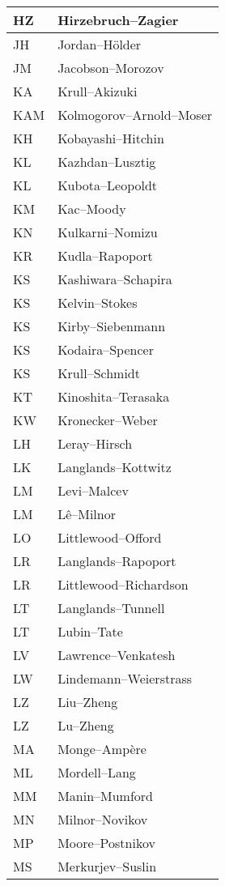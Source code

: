 \documentclass{amsart}
\numberwithin{equation}{section}
\theoremstyle{plain}
\numberwithin{equation}{section}
\theoremstyle{remark}
\begin{document}
\begin{multicols}{2}
{\begin{longtable}{l|l}
HZ & Hirzebruch--Zagier\\ \hline
JH & Jordan--Hölder\\ \hline
JM & Jacobson--Morozov\\ \hline
KA & Krull--Akizuki\\ \hline
KAM & Kolmogorov--Arnold--Moser\\ \hline
KH & Kobayashi--Hitchin\\ \hline
KL & Kazhdan--Lusztig \\ \hline
KL & Kubota--Leopoldt\\ \hline
KM & Kac--Moody\\ \hline
KN & Kulkarni--Nomizu\\ \hline
KR & Kudla--Rapoport\\ \hline
KS & Kashiwara--Schapira\\ \hline
KS & Kelvin--Stokes\\ \hline
KS & Kirby--Siebenmann\\ \hline
KS & Kodaira--Spencer\\ \hline
KS & Krull--Schmidt\\ \hline
KT & Kinoshita--Terasaka\\ \hline
KW & Kronecker--Weber\\ \hline
LH & Leray--Hirsch\\ \hline
LK & Langlands--Kottwitz\\ \hline
LM & Levi--Malcev\\ \hline
LM & Lê--Milnor\\ \hline
LO & Littlewood--Offord\\ \hline
LR & Langlands--Rapoport\\ \hline
LR & Littlewood--Richardson\\ \hline
LT & Langlands--Tunnell\\ \hline
LT & Lubin--Tate\\ \hline
LV & Lawrence--Venkatesh\\ \hline
LW & Lindemann--Weierstrass\\ \hline
LZ & Liu--Zheng\\ \hline
LZ & Lu--Zheng\\ \hline
MA & Monge--Ampère\\ \hline
ML & Mordell--Lang\\ \hline
MM & Manin--Mumford\\ \hline
MN & Milnor--Novikov\\ \hline
MP & Moore--Postnikov\\ \hline
MS & Merkurjev--Suslin\\ \hline

\end{longtable}}
\end{multicols}
\end{document}
